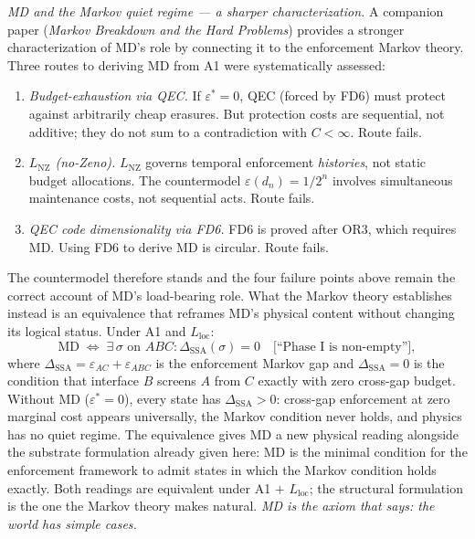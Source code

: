 \documentclass[11pt,a4paper]{article}
\theoremstyle{definition}
\newcommand{\eps}{\varepsilon}
\begin{document}
\begin{tcolorbox}[apfbox, title={MD: Uniform Per-Test Cost Floor (Regularity Condition)}]
\smallskip\noindent\textit{MD and the Markov quiet regime --- a sharper characterization.}
A companion paper (\emph{Markov Breakdown and the Hard Problems}) provides a
stronger characterization of MD's role by connecting it to the enforcement Markov
theory.  Three routes to deriving MD from A1 were systematically assessed:
\begin{enumerate}[nosep,leftmargin=2em]
  \item \textit{Budget-exhaustion via QEC.}  If $\eps^* = 0$, QEC (forced by FD6)
    must protect against arbitrarily cheap erasures.  But protection costs are
    sequential, not additive; they do not sum to a contradiction with $C < \infty$.
    Route fails.
  \item \textit{$L_{\mathrm{NZ}}$ (no-Zeno).}  $L_{\mathrm{NZ}}$ governs
    temporal enforcement \emph{histories}, not static budget allocations.  The
    countermodel $\eps(d_n) = 1/2^n$ involves simultaneous maintenance costs, not
    sequential acts.  Route fails.
  \item \textit{QEC code dimensionality via FD6.}  FD6 is proved after OR3,
    which requires MD.  Using FD6 to derive MD is circular.  Route fails.
\end{enumerate}
The countermodel therefore stands and the four failure points above remain the
correct account of MD's load-bearing role.  What the Markov theory establishes
instead is an equivalence that reframes MD's physical content without changing its
logical status.  Under A1 and $L_{\mathrm{loc}}$:
\[
  \mathrm{MD}
  \;\Longleftrightarrow\;
  \exists\,\sigma \text{ on } ABC :
  \Delta_{\mathrm{SSA}}(\sigma) = 0
  \quad\bigl[\text{``Phase~I is non-empty''}\bigr],
\]
where $\Delta_{\mathrm{SSA}} = \varepsilon_{AC} + \varepsilon_{ABC}$ is the
enforcement Markov gap and $\Delta_{\mathrm{SSA}} = 0$ is the condition that
interface $B$ screens $A$ from $C$ exactly with zero cross-gap budget.  Without MD
($\eps^* = 0$), every state has $\Delta_{\mathrm{SSA}} > 0$: cross-gap
enforcement at zero marginal cost appears universally, the Markov condition never
holds, and physics has no quiet regime.  The equivalence gives MD a new physical
reading alongside the substrate formulation already given here: MD is the minimal
condition for the enforcement framework to admit states in which the Markov
condition holds exactly.  Both readings are equivalent under A1 $+$
$L_{\mathrm{loc}}$; the structural formulation is the one the Markov theory makes
natural.  \emph{MD is the axiom that says: the world has simple cases.}
\end{tcolorbox}
\end{document}

